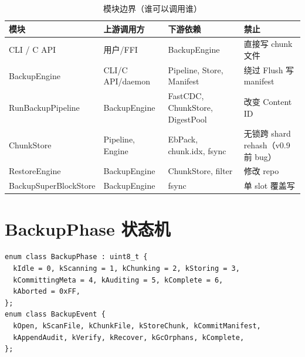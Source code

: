 \begin{table}[htbp]
\centering
\caption{模块边界（谁可以调用谁）}
\small
\begin{tabular}{@{}llll@{}}
\toprule
模块 & 上游调用方 & 下游依赖 & 禁止 \\
\midrule
CLI / C API & 用户/FFI & BackupEngine & 直接写 chunk 文件 \\
BackupEngine & CLI/C API/daemon & Pipeline, Store, Manifest & 绕过 Flush 写 manifest \\
RunBackupPipeline & BackupEngine & FastCDC, ChunkStore, DigestPool & 改变 Content ID \\
ChunkStore & Pipeline, Engine & EbPack, chunk.idx, fsync & 无锁跨 shard rehash（v0.9 前 bug） \\
RestoreEngine & BackupEngine & ChunkStore, filter & 修改 repo \\
BackupSuperBlockStore & BackupEngine & fsync & 单 slot 覆盖写 \\
\bottomrule
\end{tabular}
\end{table}

\section{BackupPhase 状态机}

\begin{lstlisting}[caption={BackupPhase 与 BackupEvent（\filepath{backup\_phase.h}）},label={lst:backup-phase}]
enum class BackupPhase : uint8_t {
  kIdle = 0, kScanning = 1, kChunking = 2, kStoring = 3,
  kCommittingMeta = 4, kAuditing = 5, kComplete = 6,
  kAborted = 0xFF,
};
enum class BackupEvent {
  kOpen, kScanFile, kChunkFile, kStoreChunk, kCommitManifest,
  kAppendAudit, kVerify, kRecover, kGcOrphans, kComplete,
};
\end{lstlisting}


